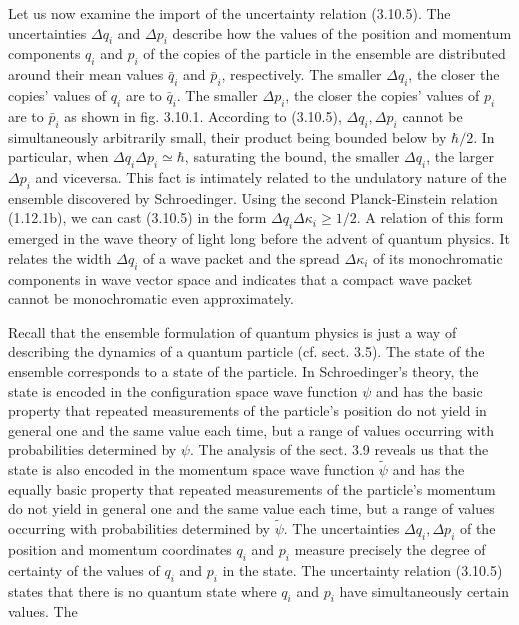 \documentclass{article}
\begin{document}
Let us now examine the import of the uncertainty relation (3.10.5). The
uncertainties $\Delta q_{i}$ and $\Delta p_{i}$ describe how the values of the position and momentum components $q_{i}$ and $p_{i}$ of the copies of the particle in the ensemble are distributed around their mean values $\bar{q}_{i}$ and $\bar{p}_{i}$, respectively. The smaller $\Delta q_{i}$, the closer the copies' values of $q_{i}$ are to $\bar{q}_{i}$. The smaller $\Delta p_{i}$, the closer the copies' values of $p_{i}$ are to $\bar{p}_{i}$ as shown in fig. 3.10.1. According to (3.10.5), $\Delta q_{i}, \Delta p_{i}$ cannot be simultaneously arbitrarily small, their product being bounded below by $\hbar / 2$. In particular, when $\Delta q_{i} \Delta p_{i} \simeq \hbar$, saturating the bound, the smaller $\Delta q_{i}$, the larger $\Delta p_{i}$ and viceversa. This fact is intimately related to the undulatory nature of the ensemble discovered by Schroedinger. Using the second Planck-Einstein relation (1.12.1b), we can cast (3.10.5) in the form $\Delta q_{i} \Delta \kappa_{i} \geq 1 / 2$. A relation of this form emerged in the wave theory of light long before the advent of quantum physics. It relates the width $\Delta q_{i}$ of a wave packet and the spread $\Delta \kappa_{i}$ of its monochromatic components in wave vector space and indicates that a compact wave packet cannot be monochromatic even approximately.

Recall that the ensemble formulation of quantum physics is just a way of describing the dynamics of a quantum particle (cf. sect. 3.5). The state of the ensemble corresponds to a state of the particle. In Schroedinger's theory, the state is encoded in the configuration space wave function $\psi$ and has the basic property that repeated measurements of the particle's position do not yield in general one and the same value each time, but a range of values occurring with probabilities determined by $\psi$. The analysis of the sect. 3.9 reveals us that the state is also encoded in the momentum space wave function $\tilde{\psi}$ and has the equally basic property that repeated measurements of the particle's momentum do not yield in general one and the same value each time, but a range of values occurring with probabilities determined by $\tilde{\psi}$. The uncertainties $\Delta q_{i}, \Delta p_{i}$ of the position and momentum coordinates $q_{i}$ and $p_{i}$ measure precisely the degree of certainty of the values of $q_{i}$ and $p_{i}$ in the state. The uncertainty relation (3.10.5) states that there is no quantum state where $q_{i}$ and $p_{i}$ have simultaneously certain values. The
\end{document}

